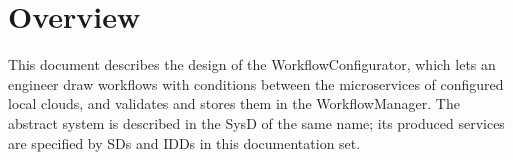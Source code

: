 \documentclass[a4paper]{arrowhead}
\begin{document}

\ArrowheadSetup

\begin{center}
  \vspace*{1cm}
  \huge{\arrowtitle}

  \vspace*{0.2cm}
  \LARGE{\arrowtype}
  \vspace*{1cm}

  
  \vspace*{\fill}

  

  \vspace*{1cm}
  \vspace*{\fill}

  \begin{abstract}
    This document describes how the WorkflowConfigurator is implemented in the Java reference implementation: its internal components, the realisation of its functional and non-functional properties, its configuration and the implementation status of the other languages. Documentation edition 5.4.0.
  \end{abstract}

  \vspace*{1cm}
\end{center}

\newpage

\tableofcontents
\newpage

\section{Overview}
\label{sec:overview}
This document describes the design of the WorkflowConfigurator, which lets an engineer draw workflows with conditions between the microservices of configured local clouds, and validates and stores them in the WorkflowManager. The abstract system is described in the
SysD of the same name; its produced services are specified by SDs and IDDs in this documentation set.
\end{document}
